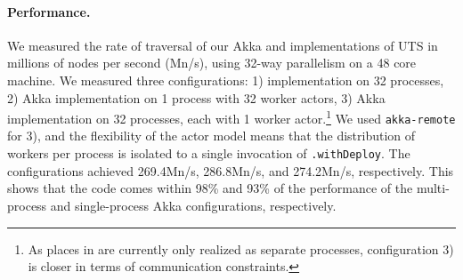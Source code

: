 \paragraph{Performance.} We measured the rate of traversal of our Akka and
\apgas implementations of UTS in millions of nodes per second (Mn/s), using
32-way parallelism on a 48 core machine. We measured three configurations: 1)
\apgas implementation on 32 processes, 2) Akka implementation on 1 process with
32 worker actors, 3) Akka implementation on 32 processes, each with 1 worker
actor.\footnote{As places in \apgas are currently only realized as separate
processes, configuration 3) is closer in terms of communication constraints.}
We used \lstinline{akka-remote} for 3), and the flexibility of the actor model
means that the distribution of workers per process is isolated to a single
invocation of \lstinline{.withDeploy}. The configurations achieved 269.4Mn/s,
286.8Mn/s, and 274.2Mn/s, respectively. This shows that the \apgas code comes
within 98\% and 93\% of the performance of the multi-process and single-process
Akka configurations, respectively.








